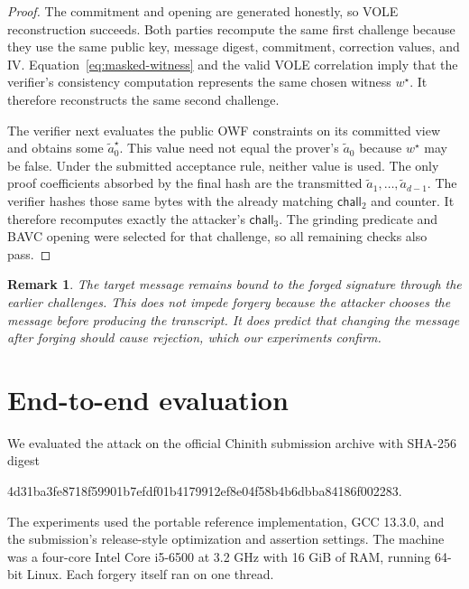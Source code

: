 \documentclass[11pt,a4paper]{article}
\newtheorem{remark}[theorem]{Remark}
\begin{document}
\begin{proof}
The commitment and opening are generated honestly, so VOLE reconstruction
succeeds.  Both parties recompute the same first challenge because they use
the same public key, message digest, commitment, correction values, and IV.
Equation~\eqref{eq:masked-witness} and the valid VOLE correlation imply that
the verifier's consistency computation represents the same chosen witness
$w^{\star}$.  It therefore reconstructs the same second challenge.

The verifier next evaluates the public OWF constraints on its committed view
and obtains some $\widetilde a_0^{\star}$.  This value need not equal the
prover's $\widetilde a_0$ because $w^{\star}$ may be false.  Under the submitted
acceptance rule, neither value is used.  The only proof coefficients absorbed
by the final hash are the transmitted
$\widetilde a_1,\ldots,\widetilde a_{d-1}$.  The verifier hashes those same
bytes with the already matching $\mathsf{chall}_2$ and counter.  It therefore
recomputes exactly the attacker's $\mathsf{chall}_3$.  The grinding predicate
and BAVC opening were selected for that challenge, so all remaining checks
also pass.
\end{proof}

\begin{remark}
The target message remains bound to the forged signature through the earlier
challenges.  This does not impede forgery because the attacker chooses the
message before producing the transcript.  It does predict that changing the
message after forging should cause rejection, which our experiments confirm.
\end{remark}

\section{End-to-end evaluation}
\label{sec:experiments}

We evaluated the attack on the official Chinith submission archive with
SHA-256 digest
\begin{center}
\small\ttfamily
4d31ba3fe8718f59901b7efdf01b4179912ef8e04f58b4b6dbba84186f002283.
\end{center}
The experiments used the portable reference implementation, GCC 13.3.0, and
the submission's release-style optimization and assertion settings.  The
machine was a four-core Intel Core i5-6500 at 3.2 GHz with 16 GiB of RAM,
running 64-bit Linux.  Each forgery itself ran on one thread.
\end{document}
